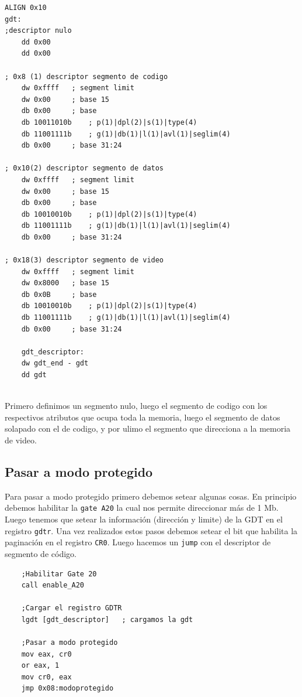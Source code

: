 \documentclass[a4paper, 10pt]{article}
\begin{document}
\lstset{language=[x86masm]Assembler}
\begin{lstlisting}
ALIGN 0x10
gdt:
;descriptor nulo
	dd 0x00	
	dd 0x00
	
; 0x8 (1) descriptor segmento de codigo
	dw 0xffff	; segment limit
	dw 0x00		; base 15
	db 0x00		; base
	db 10011010b	; p(1)|dpl(2)|s(1)|type(4)
	db 11001111b 	; g(1)|db(1)|l(1)|avl(1)|seglim(4)
	db 0x00		; base 31:24
	 
; 0x10(2) descriptor segmento de datos
	dw 0xffff	; segment limit
	dw 0x00		; base 15
	db 0x00		; base
	db 10010010b	; p(1)|dpl(2)|s(1)|type(4)
	db 11001111b 	; g(1)|db(1)|l(1)|avl(1)|seglim(4)
	db 0x00		; base 31:24 
	
; 0x18(3) descriptor segmento de video
	dw 0xffff	; segment limit
	dw 0x8000	; base 15
	db 0x0B		; base
	db 10010010b	; p(1)|dpl(2)|s(1)|type(4)
	db 11001111b 	; g(1)|db(1)|l(1)|avl(1)|seglim(4)
	db 0x00		; base 31:24
	
	gdt_descriptor:
	dw gdt_end - gdt
	dd gdt 
	
\end{lstlisting}

\newpage

Primero definimos un segmento nulo, luego el segmento de codigo con los respectivos atributos que ocupa toda la memoria, luego el segmento de datos solapado con el de codigo, y por ulimo el segmento que direcciona a la memoria de video.

\subsection{Pasar a modo protegido}

Para pasar a modo protegido primero debemos setear algunas cosas. En principio debemos habilitar la \texttt{gate A20} la cual nos permite direccionar m\'as de 1 Mb. Luego tenemos que setear 
la informaci\'on (direcci\'on y limite) de la GDT en el registro \texttt{gdtr}. Una vez realizados estos pasos debemos setear el bit que habilita la paginaci\'on en el registro \texttt{CR0}. Luego hacemos un \texttt{jump} con el descriptor de segmento de c\'odigo.

\lstset{language=[x86masm]Assembler}
\begin{lstlisting}
	;Habilitar Gate 20
	call enable_A20
	
	;Cargar el registro GDTR
	lgdt [gdt_descriptor]	; cargamos la gdt
		
	;Pasar a modo protegido
	mov eax, cr0
	or eax, 1
	mov cr0, eax
	jmp 0x08:modoprotegido
\end{lstlisting}
\end{document}
